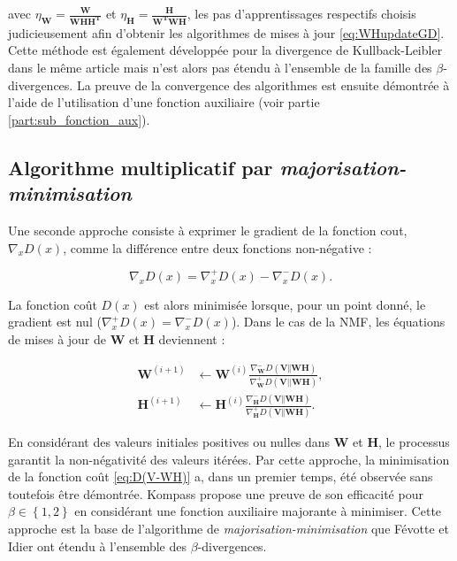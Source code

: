 avec $\eta_{\mathbf{W}} = \frac{\mathbf{W}}{\mathbf{WHH^T}}$ et $\eta_{\mathbf{H}} = \frac{\mathbf{H}}{\mathbf{W^TWH}}$, les pas d'apprentissages respectifs choisis judicieusement afin d'obtenir les algorithmes de mises à jour \ref{eq:WHupdateGD}. Cette méthode est également développée pour la divergence de Kullback-Leibler dans le même article mais n'est alors pas étendu à l'ensemble de la famille des $\beta$-divergences. La preuve de la convergence des algorithmes est ensuite démontrée à l'aide de l'utilisation d'une fonction auxiliaire (voir partie \ref{part:sub_fonction_aux}).


\subsection{Algorithme multiplicatif par \textit{majorisation-minimisation}}\label{part:majorisation-minimisation}
Une seconde approche \cite{cichocki2006csiszar} consiste à exprimer le gradient de la fonction cout, $\nabla_x D(x)$, comme la différence entre deux fonctions non-négative :

\begin{equation}
\nabla_x D(x) = \nabla_x^+ D(x) - \nabla_x^- D(x).
\end{equation}

La fonction coût $D(x)$ est alors minimisée lorsque, pour un point donné, le gradient est nul ($\nabla_x^+ D(x) = \nabla_x^- D(x)$). Dans le cas de la NMF, les équations de mises à jour de $\mathbf{W}$ et $\mathbf{H}$ deviennent :

\begin{subequations}
    \begin{align}
     \mathbf{W}^{(i+1)} & \leftarrow \mathbf{W}^{(i)}\frac{\nabla_\mathbf{W}^-D(\mathbf{V}\Vert\mathbf{WH})}{\nabla_\mathbf{W}^+D(\mathbf{V}\vert \vert \mathbf{WH})},\\
     \mathbf{H}^{(i+1)} & \leftarrow \mathbf{H}^{(i)}\frac{\nabla_\mathbf{H}^-D(\mathbf{V}\Vert\mathbf{WH})}{\nabla_\mathbf{H}^+D(\mathbf{V}\Vert\mathbf{WH})}.
    \end{align}
\end{subequations}

En considérant des valeurs initiales positives ou nulles dans $\mathbf{W}$ et $\mathbf{H}$, le processus garantit la non-négativité des valeurs itérées. Par cette approche, la minimisation de la fonction coût \ref{eq:D(V-WH)} a, dans un premier temps, été observée sans toutefois être démontrée. Kompass \cite{kompass_generalized_2007} propose une preuve de son efficacité pour $\beta \in \left\lbrace1,2 \right\rbrace$ en considérant une fonction auxiliaire majorante à minimiser. Cette approche est la base de l'algorithme de \textit{majorisation-minimisation} que Févotte et Idier \cite{fevotte_algorithms_2011} ont étendu à l'ensemble des $\beta$-divergences.

